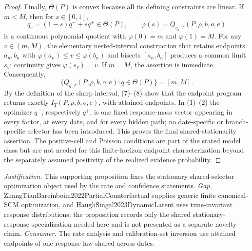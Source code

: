\documentclass{article}
\begin{document}
\begin{proof}
Finally, \(\Theta(P)\) is convex because all its defining constraints are linear.  If \(m<M\), then for \(s\in[0,1]\),
\[
 q_s=(1-s)q^-+s q^+\in\Theta(P),
 \qquad
 \varphi(s)=Q_{q_s,T}(P,\rho,b,o,e)
\]
is a continuous polynomial quotient with \(\varphi(0)=m\) and \(\varphi(1)=M\).  For any \(v\in(m,M)\), the elementary nested-interval construction that retains endpoints \(a_n,b_n\) with \(\varphi(a_n)\leq v\leq\varphi(b_n)\) and bisects \([a_n,b_n]\) produces a common limit \(s_v\); continuity gives \(\varphi(s_v)=v\).  If \(m=M\), the assertion is immediate.  Consequently,
\[
 \{Q_{q,T}(P,\rho,b,o,e):q\in\Theta(P)\}=[m,M].                            \tag{8}
\]
By the definition of the sharp interval, (7)--(8) show that the endpoint program returns exactly \(I_T(P,\rho,b,o,e)\), with attained endpoints.  In (1)--(2) the optimizer \(q^-\), respectively \(q^+\), is one fixed response-mass vector appearing in every factor, at every date, and for every hidden path; no date-specific or branch-specific selector has been introduced.  This proves the final shared-stationarity assertion.  The positive-cell and Poisson conditions are part of the stated model class but are not needed for this finite-horizon endpoint characterization beyond the separately assumed positivity of the realized evidence probability.
\end{proof}
\par\smallskip\noindent \textit{Justification.} This supporting proposition fixes the stationary shared-selector optimization object used by the rate and confidence statements. \textit{Gap.} ZhangTianBareinboim2022PartialCounterfactual supplies generic finite canonical-SCM optimization, and HaughSingal2023DynamicLatent uses time-invariant response distributions; the proposition records only the shared stationary-response specialization needed here and is not presented as a separate novelty claim. \textit{Consumer.} The rate analysis and calibration-set inversion use attained endpoints of one response law shared across dates.
\end{document}
